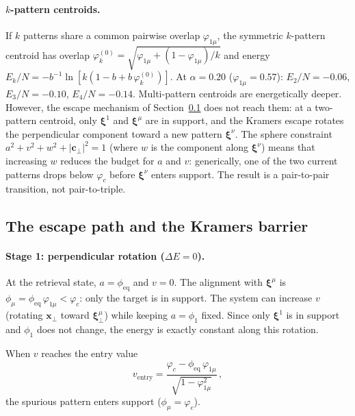 \documentclass[11pt]{article}
\newcommand{\bxi}{\boldsymbol{\xi}}
\newcommand{\bx}{\mathbf{x}}
\begin{document}
\paragraph{$k$-pattern centroids.}
If $k$ patterns share a common pairwise overlap $\varphi_{1\mu}$, the symmetric $k$-pattern centroid has overlap $\varphi_k^{(0)} = \sqrt{\varphi_{1\mu} + (1-\varphi_{1\mu})/k}$ and energy $E_k/N = -b^{-1}\ln[k(1-b+b\,\varphi_k^{(0)})]$.  At $\alpha = 0.20$ ($\varphi_{1\mu} = 0.57$): $E_2/N = -0.06$, $E_3/N = -0.10$, $E_4/N = -0.14$.  Multi-pattern centroids are energetically deeper.  However, the escape mechanism of Section~\ref{ssec:escape} does not reach them: at a two-pattern centroid, only $\bxi^1$ and $\bxi^\mu$ are in support, and the Kramers escape rotates the perpendicular component toward a new pattern $\bxi^\nu$.  The sphere constraint $a^2 + v^2 + w^2 + |\mathbf{c}_\perp|^2 = 1$ (where $w$ is the component along $\bxi^\nu$) means that increasing $w$ reduces the budget for $a$ and $v$: generically, one of the two current patterns drops below $\varphi_c$ before $\bxi^\nu$ enters support.  The result is a pair-to-pair transition, not pair-to-triple.

\subsection{The escape path and the Kramers barrier}
\label{ssec:escape}

\paragraph{Stage 1: perpendicular rotation ($\Delta E = 0$).}
At the retrieval state, $a = \phi_{\mathrm{eq}}$ and $v = 0$.  The alignment with $\bxi^\mu$ is $\phi_\mu = \phi_{\mathrm{eq}}\,\varphi_{1\mu} < \varphi_c$: only the target is in support.  The system can increase $v$ (rotating $\bx_\perp$ toward $\bxi^\mu_\perp$) while keeping $a = \phi_1$ fixed.  Since only $\bxi^1$ is in support and $\phi_1$ does not change, the energy is exactly constant along this rotation.

When $v$ reaches the entry value
\begin{equation}
v_{\mathrm{entry}} = \frac{\varphi_c - \phi_{\mathrm{eq}}\,\varphi_{1\mu}}{\sqrt{1-\varphi_{1\mu}^2}}\,,
\label{eq:ventry}
\end{equation}
the spurious pattern enters support ($\phi_\mu = \varphi_c$).
\end{document}
